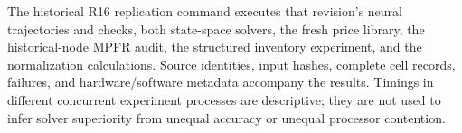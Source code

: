 The historical R16 replication command executes that revision's neural trajectories and checks, both state-space solvers, the fresh price library, the historical-node MPFR audit, the structured inventory experiment, and the normalization calculations. Source identities, input hashes, complete cell records, failures, and hardware/software metadata accompany the results. Timings in different concurrent experiment processes are descriptive; they are not used to infer solver superiority from unequal accuracy or unequal processor contention.
